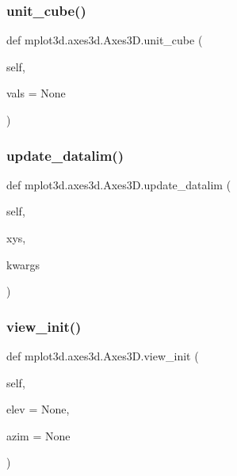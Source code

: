 \begin{DoxyVerb}
\subsubsection{\texorpdfstring{unit\+\_\+cube()}{unit\_cube()}}
{\footnotesize\ttfamily def mplot3d.\+axes3d.\+Axes3\+D.\+unit\+\_\+cube (\begin{DoxyParamCaption}\item[{}]{self,  }\item[{}]{vals = {\ttfamily None} }\end{DoxyParamCaption})}

\mbox{\label{classmplot3d_1_1axes3d_1_1Axes3D_af04cc71eabfb0a4a9d18e7dec16e1983}} 
\subsubsection{\texorpdfstring{update\+\_\+datalim()}{update\_datalim()}}
{\footnotesize\ttfamily def mplot3d.\+axes3d.\+Axes3\+D.\+update\+\_\+datalim (\begin{DoxyParamCaption}\item[{}]{self,  }\item[{}]{xys,  }\item[{}]{kwargs }\end{DoxyParamCaption})}

\mbox{\label{classmplot3d_1_1axes3d_1_1Axes3D_a329bd3a718c675e602416075e7994f98}} 
\subsubsection{\texorpdfstring{view\+\_\+init()}{view\_init()}}
{\footnotesize\ttfamily def mplot3d.\+axes3d.\+Axes3\+D.\+view\+\_\+init (\begin{DoxyParamCaption}\item[{}]{self,  }\item[{}]{elev = {\ttfamily None},  }\item[{}]{azim = {\ttfamily None} }\end{DoxyParamCaption})}


\end{DoxyVerb}
